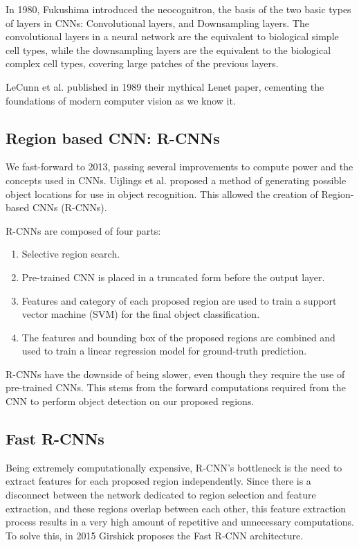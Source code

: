 \documentclass[12pt,a4paper,twocolumn,twoside]{article}
\begin{document}
In 1980, Fukushima\cite{fukushima_1980} introduced the neocognitron, the basis of the two basic types of layers in CNNs: Convolutional layers, and Downsampling layers. The convolutional layers in a neural network are the equivalent to biological simple cell types, while the downsampling layers are the equivalent to the biological complex cell types, covering large patches of the previous layers. 

LeCunn et al. published in 1989\cite{LeCunn} their mythical Lenet paper, cementing the foundations of modern computer vision as we know it.

\subsection{Region based CNN: R-CNNs}
We fast-forward to 2013, passing several improvements to compute power and the concepts used in CNNs. Uijlings et al.\cite{uijlings_van} proposed a method of generating possible object locations for use in object recognition. This allowed the creation of Region-based CNNs (R-CNNs). 

R-CNNs are composed of four parts:
\begin{enumerate}
    \item Selective region search.
    \item Pre-trained CNN is placed in a truncated form before the output layer.
    \item Features and category of each proposed region are used to train a support vector machine (SVM) for the final object classification.
    \item The features and bounding box of the proposed regions are combined and used to train a linear regression model for ground-truth prediction.
\end{enumerate}

R-CNNs have the downside of being slower, even though they require the use of pre-trained CNNs. This stems from the forward computations required from the CNN to perform object detection on our proposed regions. 

\subsection{Fast R-CNNs}

Being extremely computationally expensive, R-CNN's bottleneck is the need to extract features for each proposed region independently. Since there is a disconnect between the network dedicated to region selection and feature extraction, and these regions overlap between each other, this feature extraction process results in a very high amount of repetitive and unnecessary computations. To solve this, in 2015  Girshick\cite{girshick_2015} proposes the Fast R-CNN architecture. 
\end{document}
